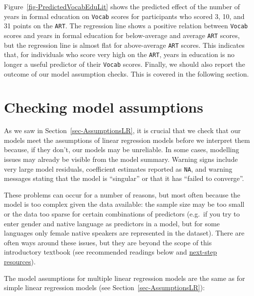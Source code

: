 \documentclass[
  letterpaper,
  DIV=11,
  numbers=noendperiod]{scrreprt}
\begin{document}
\begin{tcolorbox}
\begin{figure}[H]
\end{figure}%

Figure~\ref{fig-PredictedVocabEduLit} shows the predicted effect of the
number of years in formal education on \texttt{Vocab} scores for
participants who scored 3, 10, and 31 points on the \texttt{ART}. The
regression line shows a positive relation between \texttt{Vocab} scores
and years in formal education for below-average and average \texttt{ART}
scores, but the regression line is almost flat for above-average
\texttt{ART} scores. This indicates that, for individuals who score very
high on the \texttt{ART}, years in education is no longer a useful
predictor of their \texttt{Vocab} scores. Finally, we should also report
the outcome of our model assumption checks. This is covered in the
following section.

\end{tcolorbox}

\section{Checking model assumptions}\label{sec-ModelAssumptions}

As we saw in Section~\ref{sec-AssumptionsLR}, it is crucial that we
check that our models meet the assumptions of linear regression models
before we interpret them because, if they don't, our models may be
unreliable. In some cases, modelling issues may already be visible from
the model summary. Warning signs include very large model residuals,
coefficient estimates reported as \texttt{NA}, and warning messages
stating that the model is ``singular'' or that it has ``failed to
converge''.

These problems can occur for a number of reasons, but most often because
the model is too complex given the data available: the sample size may
be too small or the data too sparse for certain combinations of
predictors (e.g.~if you try to enter gender and native language as
predictors in a model, but for some languages only female native
speakers are represented in the dataset). There are often ways around
these issues, but they are beyond the scope of this introductory
textbook (see recommended readings below and
\href{https://elenlefoll.github.io/RstatsTextbook/A_FurtherResources.html}{next-step
resources}).

The model assumptions for multiple linear regression models are the same
as for simple linear regression models (see
Section~\ref{sec-AssumptionsLR}):
\end{document}
